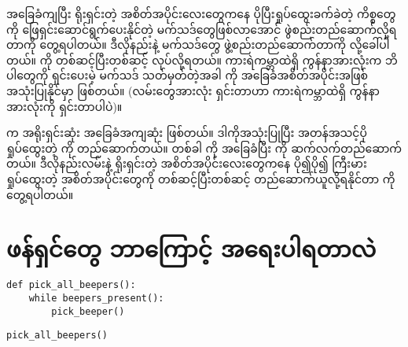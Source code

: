 အခြေခံကျပြီး ရိုးရှင်းတဲ့ အစိတ်အပိုင်းလေးတွေကနေ ပိုပြီးရှုပ်ထွေးခက်ခဲတဲ့ ကိစ္စတွေကို ဖြေရှင်းဆောင်ရွက်ပေးနိုင်တဲ့ မက်သဒ်တွေဖြစ်လာအောင် ဖွဲစည်းတည်ဆောက်လို့ရတာကို တွေ့ရပါတယ်။ ဒီလိုနည်းနဲ့ မက်သဒ်တွေ ဖွဲ့စည်းတည်ဆောက်တာကို  လို့ခေါ်ပါတယ်။   ကို တစ်ဆင့်ပြီးတစ်ဆင့် လုပ်လို့ရတယ်။ ကားရဲကမ္ဘာထဲရှိ ကွန်နာအားလုံးက ဘိပါတွေကို ရှင်းပေးမဲ့  မက်သဒ် သတ်မှတ်တဲ့အခါ  ကို အခြေခံအစိတ်အပိုင်းအဖြစ် အသုံးပြုနိုင်မှာ ဖြစ်တယ်။ (လမ်းတွေအားလုံး ရှင်းတာဟာ ကားရဲကမ္ဘာထဲရှိ ကွန်နာအားလုံးကို ရှင်းတာပါပဲ)။

 က အရိုးရှင်းဆုံး အခြေခံအကျဆုံး ဖြစ်တယ်။ ဒါကိုအသုံးပြုပြီး အတန်အသင့်ပိုရှုပ်ထွေးတဲ့  ကို တည်ဆောက်တယ်။ တစ်ခါ  ကို အခြေခံပြီး  ကို ဆက်လက်တည်ဆောက်တယ်။ ဒီလိုနည်းလမ်းနဲ့ ရိုးရှင်းတဲ့ အစိတ်အပိုင်းလေးတွေကနေ ပို၍ပို၍ ကြီးမားရှုပ်ထွေးတဲ့ အစိတ်အပိုင်းတွေကို တစ်ဆင့်ပြီးတစ်ဆင့် တည်ဆောက်ယူလို့ရနိုင်တာ  ကို တွေ့ရပါတယ်။


\section{ဖန်ရှင်တွေ ဘာကြောင့် အရေးပါရတာလဲ}

\setlength{\fboxsep}{0pt}
\begin{verbatim}
def pick_all_beepers():
    while beepers_present():
        pick_beeper()
\end{verbatim}
%
%
\setlength{\fboxsep}{0pt}
\begin{verbatim}
pick_all_beepers()
\end{verbatim}
